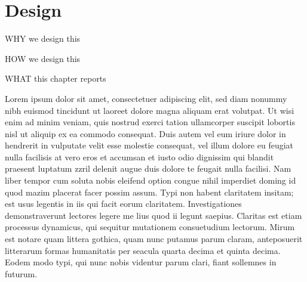 

\chapter{Design}

WHY we design this

HOW we design this

WHAT this chapter reports

Lorem ipsum dolor sit amet, consectetuer adipiscing elit, sed diam nonummy nibh euismod tincidunt ut laoreet dolore magna aliquam erat volutpat. Ut wisi enim ad minim veniam, quis nostrud exerci tation ullamcorper suscipit lobortis nisl ut aliquip ex ea commodo consequat. Duis autem vel eum iriure dolor in hendrerit in vulputate velit esse molestie consequat, vel illum dolore eu feugiat nulla facilisis at vero eros et accumsan et iusto odio dignissim qui blandit praesent luptatum zzril delenit augue duis dolore te feugait nulla facilisi. Nam liber tempor cum soluta nobis eleifend option congue nihil imperdiet doming id quod mazim placerat facer possim assum. Typi non habent claritatem insitam; est usus legentis in iis qui facit eorum claritatem. Investigationes demonstraverunt lectores legere me lius quod ii legunt saepius. Claritas est etiam processus dynamicus, qui sequitur mutationem consuetudium lectorum. Mirum est notare quam littera gothica, quam nunc putamus parum claram, anteposuerit litterarum formas humanitatis per seacula quarta decima et quinta decima. Eodem modo typi, qui nunc nobis videntur parum clari, fiant sollemnes in futurum.




